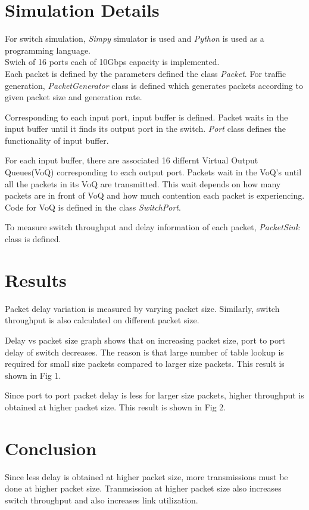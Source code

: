 \documentclass[twocolumn,10pt]{article}
\begin{document}
\section{Simulation Details}
For switch simulation, \textit{Simpy} simulator is used and \textit{Python} is used as a programming language.\\
Swich of 16 ports each of 10Gbps capacity is implemented.\\
Each packet is defined by the parameters defined the class \textit{Packet}.
For traffic generation, \textit{PacketGenerator} class is defined which generates packets according to given packet size and generation rate.

Corresponding to each input port, input buffer is defined. Packet waits in the input buffer until it finds its output port in the switch.
\textit{Port} class defines the functionality of input buffer.

For each input buffer, there are associated 16 differnt Virtual Output Queues(VoQ) corresponding to each output port.
Packets wait in the VoQ's until all the packets in its VoQ are transmitted. 
This wait depends on how many packets are in front of VoQ and how much contention each packet is experiencing.
Code for VoQ is defined in the class \textit{SwitchPort}.

To measure switch throughput and delay information of each packet, \textit{PacketSink} class is defined.

\section{Results}
Packet delay variation is measured by varying packet size. 
Similarly, switch throughput is also calculated on different packet size.
 
Delay vs packet size graph shows that on increasing packet size, port to port delay of switch decreases. 
The reason is that large number of table lookup is required for small size packets compared to larger size packets. 
This result is shown in Fig 1.

Since port to port packet delay is less for larger size packets, higher throughput is obtained at higher packet size.
This result is shown in Fig 2.

\section{Conclusion}
Since less delay is obtained at higher packet size, more transmissions must be done at higher packet size.
Tranmsission at higher packet size also increases switch throughput and also increases link utilization.
\end{document}
